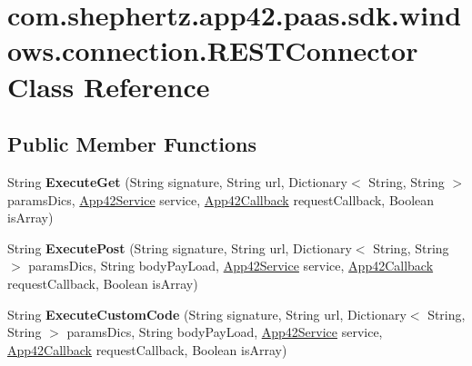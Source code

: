 \hypertarget{classcom_1_1shephertz_1_1app42_1_1paas_1_1sdk_1_1windows_1_1connection_1_1_r_e_s_t_connector}{\section{com.\+shephertz.\+app42.\+paas.\+sdk.\+windows.\+connection.\+R\+E\+S\+T\+Connector Class Reference}
\label{classcom_1_1shephertz_1_1app42_1_1paas_1_1sdk_1_1windows_1_1connection_1_1_r_e_s_t_connector}
}
\subsection*{Public Member Functions}
\begin{DoxyCompactItemize}
\item 
\hypertarget{classcom_1_1shephertz_1_1app42_1_1paas_1_1sdk_1_1windows_1_1connection_1_1_r_e_s_t_connector_a8c7637f3c0ddd09b5dabb9eb6959bfdd}{String {\bfseries Execute\+Get} (String signature, String url, Dictionary$<$ String, String $>$ params\+Dics, \hyperlink{classcom_1_1shephertz_1_1app42_1_1paas_1_1sdk_1_1windows_1_1_app42_service}{App42\+Service} service, \hyperlink{interfacecom_1_1shephertz_1_1app42_1_1paas_1_1sdk_1_1windows_1_1_app42_callback}{App42\+Callback} request\+Callback, Boolean is\+Array)}\label{classcom_1_1shephertz_1_1app42_1_1paas_1_1sdk_1_1windows_1_1connection_1_1_r_e_s_t_connector_a8c7637f3c0ddd09b5dabb9eb6959bfdd}

\item 
\hypertarget{classcom_1_1shephertz_1_1app42_1_1paas_1_1sdk_1_1windows_1_1connection_1_1_r_e_s_t_connector_a2402a4ce4efd8346a94376aa0a205f6d}{String {\bfseries Execute\+Post} (String signature, String url, Dictionary$<$ String, String $>$ params\+Dics, String body\+Pay\+Load, \hyperlink{classcom_1_1shephertz_1_1app42_1_1paas_1_1sdk_1_1windows_1_1_app42_service}{App42\+Service} service, \hyperlink{interfacecom_1_1shephertz_1_1app42_1_1paas_1_1sdk_1_1windows_1_1_app42_callback}{App42\+Callback} request\+Callback, Boolean is\+Array)}\label{classcom_1_1shephertz_1_1app42_1_1paas_1_1sdk_1_1windows_1_1connection_1_1_r_e_s_t_connector_a2402a4ce4efd8346a94376aa0a205f6d}

\item 
\hypertarget{classcom_1_1shephertz_1_1app42_1_1paas_1_1sdk_1_1windows_1_1connection_1_1_r_e_s_t_connector_aebd6d27c0203156c76df47bda25af4de}{String {\bfseries Execute\+Custom\+Code} (String signature, String url, Dictionary$<$ String, String $>$ params\+Dics, String body\+Pay\+Load, \hyperlink{classcom_1_1shephertz_1_1app42_1_1paas_1_1sdk_1_1windows_1_1_app42_service}{App42\+Service} service, \hyperlink{interfacecom_1_1shephertz_1_1app42_1_1paas_1_1sdk_1_1windows_1_1_app42_callback}{App42\+Callback} request\+Callback, Boolean is\+Array)}\label{classcom_1_1shephertz_1_1app42_1_1paas_1_1sdk_1_1windows_1_1connection_1_1_r_e_s_t_connector_aebd6d27c0203156c76df47bda25af4de}


\end{DoxyCompactItemize}
